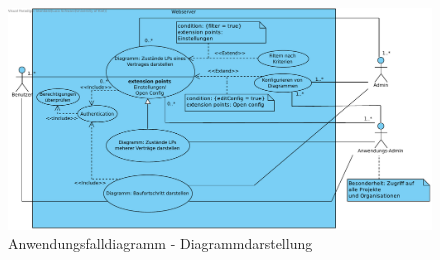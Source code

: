 \begin{figure}[h]
	\centering
	\includegraphics[width=\linewidth]{img/diagrams/Diagram_Display_Management_Web.pdf}
	\caption{Anwendungsfalldiagramm - Diagrammdarstellung}
	\label{fig:anwendungsfalldiagramm-dia-management}
\end{figure}

\newpage

